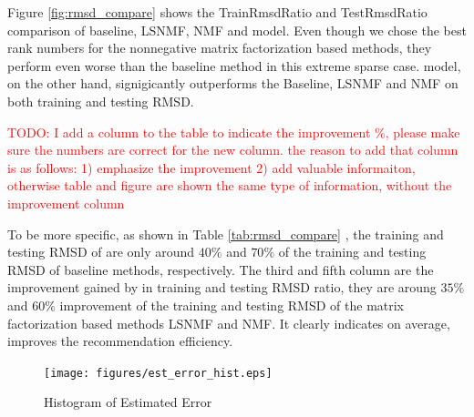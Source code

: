 Figure \ref{fig:rmsd_compare} shows the TrainRmsdRatio and TestRmsdRatio comparison of baseline, LSNMF, NMF and
{\sppan} model. Even though we
chose the best rank numbers for the nonnegative matrix factorization
based methods, they perform even worse than the baseline method in
this extreme sparse case. {\sppan} model, on the other hand, signigicantly outperforms
the Baseline, LSNMF and NMF on both training and testing RMSD.



\textcolor{red}{TODO: I add a column to the table to indicate the improvement \%, please make sure the numbers are correct for the new column. 
the reason to add that column is as follows: 1) emphasize the improvement 2) add valuable informaiton, otherwise table and figure are shown the same type of information, without the improvement column}

To be more specific, as shown in Table \ref{tab:rmsd_compare} , the training and testing RMSD of {\sppan} are only around
$40\%$ and $70\%$ of the training and testing RMSD of baseline
methods, respectively. The third and fifth column are the improvement gained
by {\sppan} in training and testing RMSD ratio, they are aroung $35\%$ and $60\%$ improvement of the
training and testing RMSD of the matrix factorization based methods
LSNMF and NMF.  It clearly indicates on average, {\sppan} improves the
recommendation efficiency.


\begin{figure}[!ht]
  \centering
  \texttt{[image: figures/est\_error\_hist.eps]}
  \caption{Histogram of Estimated Error}
  \label{fig:est_err}
\end{figure}

